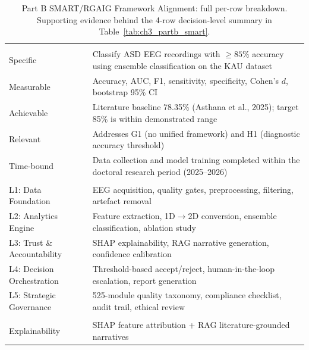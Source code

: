 {
\begin{xltabular}{\textwidth}{@{} >{\raggedright\arraybackslash}p{2.0cm} L @{}}
\caption[Part B SMART/RGAIG Alignment: Full Per-Row Breakdown]{Part B SMART/RGAIG Framework Alignment: full per-row breakdown. Supporting evidence behind the 4-row decision-level summary in Table~\ref{tab:ch3_partb_smart}.}\label{tab:appc_partb_smart_full} \\
\toprule
{} &  \\
\midrule
\endfirsthead
\endhead
\bottomrule
\endlastfoot
{} \\
\addlinespace
Specific & Classify ASD EEG recordings with $\geq 85\%$ accuracy using ensemble classification on the KAU dataset \\
Measurable & Accuracy, AUC, F1, sensitivity, specificity, Cohen's $d$, bootstrap 95\% CI \\
Achievable & Literature baseline 78.35\% (Asthana et al., 2025); target 85\% is within demonstrated range \\
Relevant & Addresses G1 (no unified framework) and H1 (diagnostic accuracy threshold) \\
Time-bound & Data collection and model training completed within the doctoral research period (2025--2026) \\
\midrule
{} \\
\addlinespace
L1: Data Foundation & EEG acquisition, quality gates, preprocessing, filtering, artefact removal \\
L2: Analytics Engine & Feature extraction, 1D$\to$2D conversion, ensemble classification, ablation study \\
L3: Trust \& Accountability & SHAP explainability, RAG narrative generation, confidence calibration \\
L4: Decision Orchestration & Threshold-based accept/reject, human-in-the-loop escalation, report generation \\
L5: Strategic Governance & 525-module quality taxonomy, compliance checklist, audit trail, ethical review \\
\midrule
{} \\
\addlinespace
Explainability & SHAP feature attribution + RAG literature-grounded narratives \\

\end{xltabular}}
